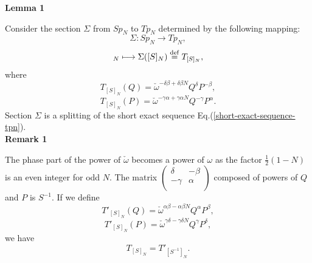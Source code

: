 \documentclass[12pt]{iopart}
\newcommand{\deq}{\stackrel{\rm{\tiny def}}{=}}
\begin{document}
\noindent
{\bf Lemma 1}
\vspace{2mm}

Consider the section \(\Sigma\) from \(Sp_N\) to \(Tp_N\)
determined by the following mapping:
\begin{equation}
\Sigma: Sp_N\longrightarrow Tp_N,
\end{equation}
\begin{equation}
[S]_N\longmapsto\Sigma([S]_N)\deq T_{[S]_N},
\end{equation}
where
\begin{equation}
T_{[S]_N}(Q)=\check\omega^{-\delta\beta+\delta\beta N}Q^\delta P^{-\beta},
\label{splitting-odd-Q-prime}
\end{equation}
\begin{equation}
T_{[S]_N}(P)=\check\omega^{-\gamma\alpha+\gamma\alpha N}Q^{-\gamma}P^\alpha.
\label{splitting-odd-P-prime}
\end{equation}
Section \(\Sigma\) is a splitting of the short exact sequence Eq.(\ref{short-exact-sequence-tpn}).
\\

\noindent
{\bf Remark 1}
\vspace{2mm}

The phase part of the power of \(\check\omega\) becomes a power of \(\omega\)
as the factor \(\displaystyle\frac12(1-N)\) is an even integer for odd \(N\).
%
The matrix
\(\left(\begin{array}{cc}
\delta & -\beta \\
-\gamma & \alpha \\
\end{array}\right)\)
composed of powers of \(Q\) and \(P\) is \(S^{-1}\).
If we define
\begin{equation}
T'_{[S]_N}(Q)=\check\omega^{\alpha\beta-\alpha\beta N}Q^\alpha P^\beta,
\label{splitting-odd-Q}
\end{equation}
\begin{equation}
T'_{[S]_N}(P)=\check\omega^{\gamma\delta-\gamma\delta N}Q^\gamma P^\delta,
\label{splitting-odd-P}
\end{equation}
we have
\begin{equation}
T_{[S]_N}=T'_{[S^{-1}]_N}.
\end{equation}
\ \\
\end{document}
